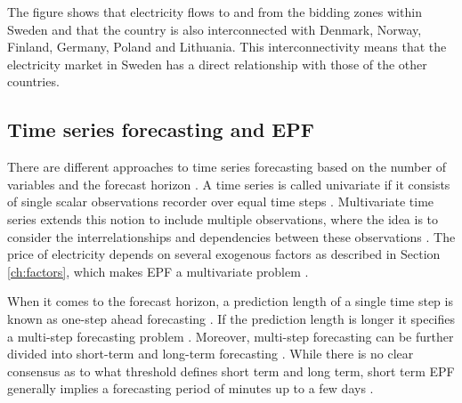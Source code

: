The figure shows that electricity flows to and from the bidding zones within Sweden and that the country is also interconnected with Denmark, Norway, Finland, Germany, Poland and Lithuania. This interconnectivity means that the electricity market in Sweden has a direct relationship with those of the other countries\cite{transmission, government_plan}. 

\subsection{Time series forecasting and EPF} \label{timeseriesintro}

There are different approaches to time series forecasting based on the number of variables and the forecast horizon \cite{multivariate}. A time series is called univariate if it consists of single scalar observations recorder over equal time steps \cite{multivariate}. Multivariate time series extends this notion to include multiple observations, where the idea is to consider the interrelationships and dependencies between these observations \cite{multivariate}. The price of electricity depends on several exogenous factors as described in Section \ref{ch:factors}, which makes EPF a multivariate problem \cite{epf_is_multivariate}. 

When it comes to the forecast horizon, a prediction length of a single time step is known as one-step ahead forecasting \cite{LAGO2021116983, multivariate}. If the prediction length is longer it specifies a multi-step forecasting problem \cite{multivariate}. Moreover, multi-step forecasting can be further divided into short-term and long-term forecasting \cite{multivariate}. While there is no clear consensus as to what threshold defines short term and long term, short term EPF generally implies a forecasting period of minutes up to a few days \cite{LAGO2021116983}. 

